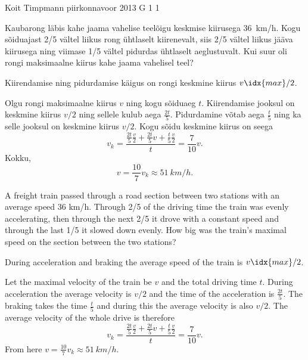{Koit Timpmann} %
{piirkonnavoor} %
{2013} %
{G 1} %
{1} %
{
\ifStatement
Kaubarong läbis kahe jaama vahelise teelõigu keskmise kiirusega \SI{36}{km/h}.
Kogu sõiduajast 2/5 vältel liikus rong ühtlaselt kiirenevalt, siis 2/5 vältel
liikus jääva kiirusega ning viimase 1/5 vältel pidurdas ühtlaselt aeglustuvalt.
Kui suur oli rongi maksimaalne kiirus kahe jaama vahelisel teel?
\fi


\ifHint
Kiirendamise ning pidurdamise käigus on rongi keskmine kiirus $v\idx{max}/2$.
\fi


\ifSolution
Olgu rongi maksimaalne kiirus $v$ ning kogu sõiduaeg $t$. Kiirendamise jooksul on keskmine kiirus $v/2$ ning sellele kulub aega $\frac{2t}{5}$. Pidurdamine võtab aega $\frac{t}{5}$ ning ka selle jooksul on keskmine kiirus $v/2$. Kogu sõidu keskmine kiirus on seega 
$$v_k = \frac{\frac{2t}{5} \frac{v}{2}+\frac{2t}{5} v + \frac{t}{5} \frac{v}{2}}{t} = \frac{7}{10} v.$$ 
Kokku,
\[
v=\frac{10}{7}v_k \approx \SI{51}{km/h}.
\]
\fi


\ifEngStatement
A freight train passed through a road section between two stations with an average speed 36 km/h. Through 2/5 of the driving time the train was evenly accelerating, then through the next 2/5 it drove with a constant speed and through the last 1/5 it slowed down evenly. How big was the train’s maximal speed on the section between the two stations?
\fi


\ifEngHint
During acceleration and braking the average speed of the train is $v\idx{max}/2$.
\fi


\ifEngSolution
Let the maximal velocity of the train be $v$ and the total driving time $t$. During acceleration the average velocity is $v/2$ and the time of the acceleration is $\frac{2t}{5}$. The braking takes the time $\frac{t}{5}$ and during this the average velocity is also $v/2$. The average velocity of the whole drive is therefore
$$v_k = \frac{\frac{2t}{5} \frac{v}{2}+\frac{2t}{5} v + \frac{t}{5} \frac{v}{2}}{t} = \frac{7}{10} v.$$
From here $v=\frac{10}{7}v_k \approx \SI{51}{km/h}$.
\fi
}